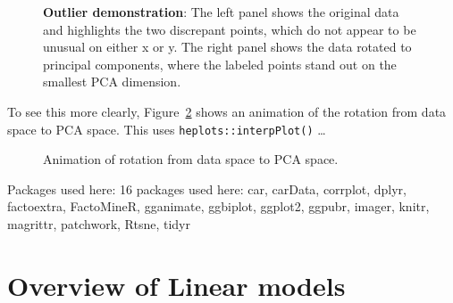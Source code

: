 \documentclass[
  letterpaper,
  10pt,
  krantz2]{krantz}
\begin{document}
{\begin{figure}
{}

\caption{\label{fig-outlier-demo}\textbf{Outlier demonstration}: The
left panel shows the original data and highlights the two discrepant
points, which do not appear to be unusual on either x or y. The right
panel shows the data rotated to principal components, where the labeled
points stand out on the smallest PCA dimension.}

\end{figure}%

To see this more clearly, Figure~\ref{fig-outlier-animation} shows an
animation of the rotation from data space to PCA space. This uses
\texttt{heplots::interpPlot()} \ldots{}

\begin{figure}

\centering{

}

\caption{\label{fig-outlier-animation}Animation of rotation from data
space to PCA space.}

\end{figure}%

Packages used here: 16 packages used here: car, carData, corrplot,
dplyr, factoextra, FactoMineR, gganimate, ggbiplot, ggplot2, ggpubr,
imager, knitr, magrittr, patchwork, Rtsne, tidyr


\chapter{Overview of Linear models}\label{sec-linear-models}

\renewcommand*{\vec}[1]{\mathbf{#1}}
\newcommand{\trans}{^\mathsf{T}}
\newcommand*{\mat}[1]{\mathbf{#1}}
\newcommand*{\diag}[1]{\mathrm{diag}\, #1}

\renewcommand*{\det}[1]{\mathrm{det}(#1)}
\newcommand*{\rank}[1]{\mathrm{rank} (\mathbf{#1})}
\newcommand*{\trace}[1]{\mathrm{tr} (\mathbf{#1})}
\newcommand*{\dev}[1]{(#1 - \bar{#1})}
\newcommand*{\inv}[1]{\mat{#1}^{-1}}
\newcommand*{\half}[1]{\mat{#1}^{1/2}}
\newcommand*{\invhalf}[1]{\mat{#1}^{-1/2}}
\newcommand*{\nvec}[2]{{#1}_{1}, {#1}_{2},\ldots,{#1}_{#2}}
\newcommand*{\Beta}{\boldsymbol{B}}
\newcommand*{\Epsilon}{\boldsymbol{\Large\varepsilon}}
\newcommand*{\period}{\:\: .}
\newcommand*{\comma}{\:\: ,}
\newcommand*{\given}{\, | \,}
\newcommand*{\Real}[1]{\mathbb{R}^{#1}}
\newcommand*{\degree}[1]{{#1}^{\circ}}

\newcommand{\sizedmat}[2]{\mathord{\mathop{\mat{#1}}\limits_{#2}}}

}
\end{document}
